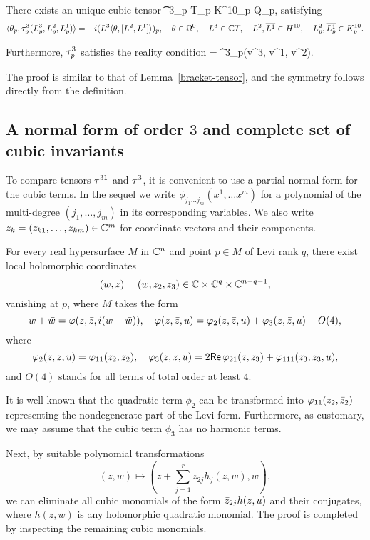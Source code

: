 \documentclass[12pt]{amsart}
\begin{document}
There exists an unique cubic tensor
\beq
	\t^3_p \colon \C T_p \times  K^{10}_p \times {} \to \C Q_p,
\eeq
satisfying
	$$
		\langle \theta_p, \tau^3_p(L^3_p, L^2_p, L^1_p) \rangle
		= -i (L^3\langle \theta, [L^2, L^1] \rangle)_p
		,
		\quad \theta\in \Omega^0,
		\quad L^3 \in {\mathbb{C}} T,
		\quad L^2, \overline{L^1} \in H^{10},
		\quad L^2_p, \overline{L^1_p}\in K^{10}_p.
	$$

Furthermore, $\tau^3_p$ satisfies the reality condition
\beq{}
 = \t^3_p(\1v^3, \1v^1, \1v^2).
\eeq
\el

\bpf
The proof is similar to that of Lemma~\ref{bracket-tensor},
and the symmetry follows directly from the definition.
\epf



\subsection{A normal form of order $3$ and complete set of cubic invariants}
To compare tensors $\tau^{31}$ and $\tau^3$,
it is convenient to use a partial normal form
for the cubic terms.
In the sequel we write $\phi_{j_1\ldots j_m}(x^1,\ldots x^m)$
for a polynomial of the multi-degree $(j_1,\ldots, j_m)$
in its corresponding variables.
We also write 
$z_k=(z_{k1},\ldots, z_{km})\in {\mathbb{C}}^m$
for coordinate vectors and their components.

\bp{}
For every real hypersurface $M$ in ${\mathbb{C}}^{n}$ and point $p\in M$ of Levi rank $q$, 
there exist local holomorphic coordinates 
$$
	(w,z)=(w, z_2, z_3)\in {\mathbb{C}}\times {\mathbb{C}}^q\times {\mathbb{C}}^{n-q-1},
$$ 
vanishing at $p$,
where $M$ takes the form
$$
	w + {\bar w} = \varphi(z,{\bar z}, i(w-{\bar w})), 
	\quad
	\varphi(z,{\bar z},u) = \varphi_2(z,{\bar z},u) + \varphi_3(z,{\bar z},u) + O(4), 
$$
where
$$
	\varphi_2(z,{\bar z},u) = \varphi_{11}(z_2, {\bar z}_2),
	\quad
	\varphi_3(z,{\bar z},u) = 2{\sf Re}\, \varphi_{21}(z,{\bar z}_3) + \varphi_{111}(z_3, {\bar z}_3, u),
$$
and $O(4)$ stands for all terms of total order at least $4$.
\ep


\bpf
It is well-known that the quadratic term $\phi_2$ 
can be transformed into $\varphi_{11}(z_2, {\bar z}_2)$ 
representing the nondegenerate part of the Levi form.
Furthermore, as customary, we may assume that the cubic term $\phi_3$ has no harmonic terms.

Next, by suitable polynomial transformations 
$$
	(z,w)\mapsto (z + \sum_{j=1}^r z_{2j} h_j(z,w) , w),
$$
we can eliminate all cubic monomials of the form ${\bar z}_{2j} h(z,u)$
and their conjugates, where $h(z,w)$ is any holomorphic quadratic monomial.
The proof is completed by inspecting the remaining cubic monomials.
\epf
\end{document}
